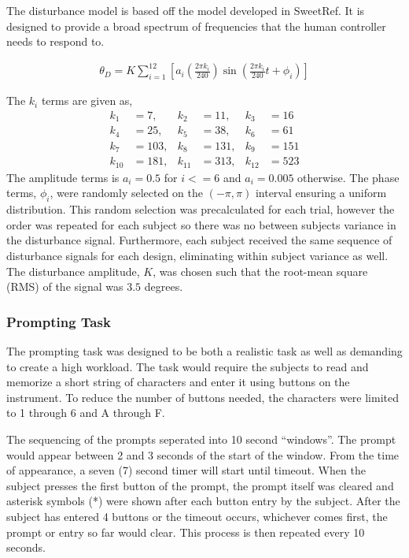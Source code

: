 The disturbance model is based off the model developed in SweetRef.
It is designed to provide a broad spectrum of frequencies that the human controller needs to respond to.

\begin{align}
    \theta_D = K\sum\limits_{i=1}^{12} \left[ a_i \left(\frac{2\pi k_i}{240} \right) \sin\left( \frac{2\pi k_i}{240}t + \phi_i \right) \right]
\end{align}

The $k_i$ terms are given as,
\begin{align*}
    k_1 &= 7, & k_2 &= 11, & k_3 &= 16 \\
    k_4 &= 25, & k_5 &= 38, & k_6 &= 61 \\
    k_7 &= 103, & k_8 &= 131, & k_9 &= 151 \\
    k_{10} &= 181, & k_{11} &= 313, & k_{12} &= 523
\end{align*}
The amplitude terms is $a_i=0.5$ for $i <= 6$ and $a_i=0.005$ otherwise.
The phase terms, $\phi_i$, were randomly selected on the $(-\pi, \pi)$ interval ensuring a uniform distribution.
This random selection was precalculated for each trial, however the order was repeated for each subject so there was no between subjects variance in the disturbance signal.
Furthermore, each subject received the same sequence of disturbance signals for each design, eliminating within subject variance as well.
The disturbance amplitude, $K$, was chosen such that the root-mean square (RMS) of the signal was $3.5$ degrees.

\subsubsection{Prompting Task}

The prompting task was designed to be both a realistic task as well as demanding to create a high workload.
The task would require the subjects to read and memorize a short string of characters and enter it using buttons on the instrument.
To reduce the number of buttons needed, the characters were limited to 1 through 6 and A through F.

The sequencing of the prompts seperated into 10 second ``windows''.
The prompt would appear between 2 and 3 seconds of the start of the window.
From the time of appearance, a seven (7) second timer will start until timeout.
When the subject presses the first button of the prompt, the prompt itself was cleared and asterisk symbols (*) were shown after each button entry by the subject.
After the subject has entered 4 buttons or the timeout occurs, whichever comes first, the prompt or entry so far would clear.
This process is then repeated every 10 seconds.

